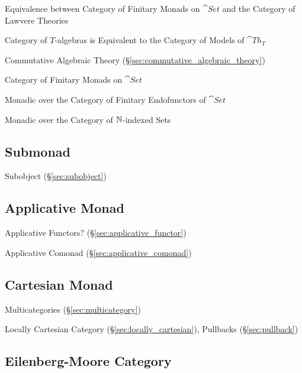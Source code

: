 Equivalence between Category of Finitary Monads on $\cat{Set}$ and the
Category of Lawvere Theories %

Category of $T$-algebras is Equivalent to the Category of Models of
$\cat{Th}_T$ %

Commutative Algebraic Theory
(\S\ref{sec:commutative_algebraic_theory})

Category of Finitary Monads on $\cat{Set}$

Monadic over the Category of Finitary Endofunctors of $\cat{Set}$

Monadic over the Category of $\mathbb{N}$-indexed Sets



\subsection{Submonad}\label{sec:submonad}

Subobject (\S\ref{sec:subobject})



\subsection{Applicative Monad}\label{sec:applicative_monad}

Applicative Functors? (\S\ref{sec:applicative_functor})

Applicative Comonad (\S\ref{sec:applicative_comonad})



\subsection{Cartesian Monad}\label{sec:cartesian_monad}

Multicategories (\S\ref{sec:multicategory})

Locally Cartesian Category (\S\ref{sec:locally_cartesian}), Pullbacks
(\S\ref{sec:pullback})



\subsection{Eilenberg-Moore Category}\label{sec:eilenberg_moore}

